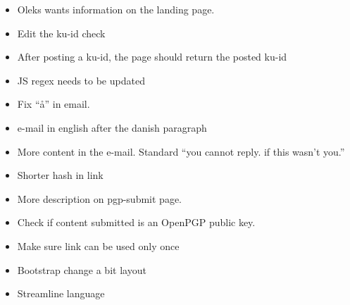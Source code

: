 \documentclass[11pt,a4paper]{report}
\begin{document}
\begin{appendices}
\begin{itemize}
\item Oleks wants information on the landing page.\\
\item Edit the ku-id check\\
\item After posting a ku-id, the page should return the posted ku-id\\
\item JS regex needs to be updated\\
\item Fix ``å'' in email.\\
\item e-mail in english after the danish paragraph\\
\item More content in the e-mail. Standard ``you cannot reply. if this wasn't you.''\\
\item Shorter hash in link\\
\item More description on pgp-submit page.\\
\item Check if content submitted is an OpenPGP public key.\\
\item Make sure link can be used only once\\
\item Bootstrap change a bit layout\\
\item Streamline language\\
\end{itemize}



\end{appendices}
\nocite{*}



\end{document}
